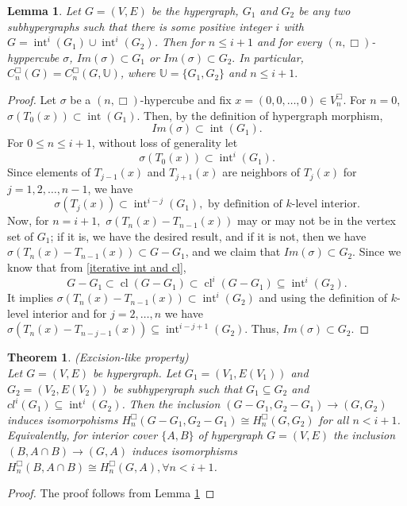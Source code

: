 \documentclass[10pt,a4paper]{amsart}
\newtheorem{thm}{Theorem}[section]
\newtheorem{lem}[subsection]{Lemma}
\newcommand{\cl}{\operatorname{cl}}
\renewcommand{\int}{\operatorname{int}}
\begin{document}
\begin{lem}\label{lemma box excision-like}
Let $G=(V,E)$ be the hypergraph, $G_1$ and $G_2$ be any two subhypergraphs such that there is some positive integer $i$ with  $G=\int^i(G_1)\cup \int^i(G_2)$. Then for $n\leq i+1$ and for every $(n,\Box)$-hyppercube $\sigma$, $Im(\sigma)\subset G_1$ or $Im(\sigma) \subset G_2.$ In particular, $C_n^\Box(G)=C_n^\Box(G,\mathbb{U})$, where $\mathbb{U}=\{G_1,G_2\}$ and $n\leq i+1.$
\end{lem}
\begin{proof}
Let $\sigma$ be a $(n,\Box)$-hypercube and fix $x=(0,0,\ldots,0) \in V_n^\Box$. For $n=0$,  $\sigma(T_0(x)) \subset   \int(G_1)$.  
Then, by the definition of hypergraph morphism,
\[
 {Im}(\sigma) \subset   \int(G_1).
\]
For $0 \le n \le i+1$, without loss of generality let
\[ \sigma(T_0(x)) \subset   \int^i(G_1). \]
Since elements of $T_{j-1}(x)$ and $T_{j+1}(x)$ are neighbors of $T_j(x)$ for $j=1,2,\ldots, n-1 $, we have
\[
\sigma(T_j(x)) \subset   \int^{i-j}(G_1), \text{ by definition of $k$-level interior}.\]
Now, for $n=i+1,$ $\sigma(T_n(x)-T_{n-1}(x))$ may or may not be in the vertex set of $G_1$; if it is, we have the desired result, and if it is not, then we have $\sigma(T_n(x)-T_{n-1}(x))\subset G-G_1$, and we claim that $Im(\sigma)\subset G_2$. Since we know that from \ref{iterative int and cl}, \[G-G_1\subset \cl(G-G_1)\subset \cl^i(G-G_1)\subseteq \int^i(G_2).\] It implies $\sigma(T_n(x)-T_{n-1}(x))\subset \int^i(G_2)$ and using the definition of $k$-level interior and for  $j=2,\ldots,n$ we have $\sigma(T_{n}(x)-T_{n-j-1}(x))\subseteq \int^{i-j+1}(G_2)$. Thus, $Im(\sigma)\subset G_2$.
\end{proof}



\begin{thm}
(Excision-like property)\\
Let $G=(V,E)$ be hypergraph. Let $G_1=(V_1,E(V_1))$ and $G_2=(V_2,E(V_2))$ be subhypergraph such that $G_1\subseteq G_2$ and $cl^i(G_1)\subseteq  \int^i(G_2)$. Then the inclusion $(G-G_1,G_2-G_1)\rightarrow (G,G_2)$ induces isomorpohisms $H_{n}^\Box(G-G_1,G_2-G_1)\cong H_{n}^\Box(G,G_2)$ for all $n< i+1$. Equivalently, for interior cover $\{A,B\}$ of hypergraph $G=(V,E)$ the inclusion $(B,A\cap B)\rightarrow (G,A)$ induces isomorphisms $H_{n}^\Box(B,A\cap B)\cong H_{n}^\Box(G,A), \forall n<i+1$.
\end{thm}



\begin{proof}
The proof follows from Lemma \ref{lemma box excision-like}
\end{proof}
\end{document}
